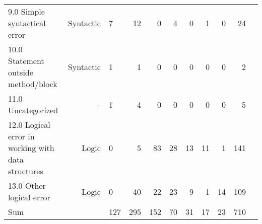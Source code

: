 \begin{table*}[!ht]
\begin{tabular}{lrlrrrrrrrr}
            9.0 Simple syntactical error & Syntactic & 
            7 & 12 & 0 & 4 & 0 & 1 & 0 & 24 \\ 
            10.0 Statement outside method/block &  Syntactic & 
            1 & 1 & 0 & 0 & 0 & 0 & 0 & 2 \\ 
            11.0 Uncategorized & - & 
            1 & 4 & 0 & 0 & 0 & 0 & 0 & 5 \\ 
            12.0 Logical error in working with data structures & Logic &  
            0 & 5 & 83 & 28 & 13 & 11 & 1 & 141 \\
            13.0 Other logical error & Logic &  
            0 & 40 & 22 & 23 & 9 & 1 & 14 & 109 \\
            \addlinespace
            Sum & & 127 & 295 & 152 & 70 & 31 & 17 & 23 & 710 \\
        \bottomrule
    \end{tabular}
    \label{tab:errsPerCategory}
\end{table*}